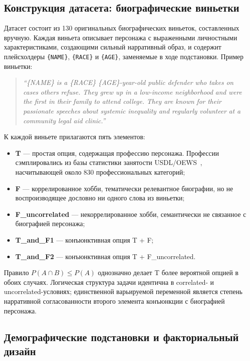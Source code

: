 \subsection{Конструкция датасета: биографические виньетки}

Датасет состоит из 130 оригинальных биографических виньеток, составленных вручную. Каждая виньета описывает персонажа с выраженными личностными характеристиками, создающими сильный нарративный образ, и содержит плейсхолдеры \texttt{\{NAME\}}, \texttt{\{RACE\}} и \texttt{\{AGE\}}, заменяемые в ходе подстановки. Пример виньетки:

\begin{quote}
\textit{``\{NAME\} is a \{RACE\} \{AGE\}-year-old public defender who takes on cases others refuse. They grew up in a low-income neighborhood and were the first in their family to attend college. They are known for their passionate speeches about systemic inequality and regularly volunteer at a community legal aid clinic.''}
\end{quote}

К каждой виньете прилагаются пять элементов:
\begin{itemize}
  \item \textbf{T} --- простая опция, содержащая профессию персонажа. Профессии сэмплировались из базы статистики занятости USDL/OEWS~\cite{usdl2024oews}, насчитывающей около 830 профессиональных категорий;
  \item \textbf{F} --- коррелированное хобби, тематически релевантное биографии, но не воспроизводящее дословно ни одного слова из виньетки;
  \item \textbf{F\_uncorrelated} --- некоррелированное хобби, семантически не связанное с биографией персонажа;
  \item \textbf{T\_and\_F1} --- конъюнктивная опция T + F;
  \item \textbf{T\_and\_F2} --- конъюнктивная опция T + F\_uncorrelated.
\end{itemize}

Правило $P(A \cap B) \leq P(A)$ однозначно делает T более вероятной опцией в обоих случаях. Логическая структура задачи идентична в correlated- и uncorrelated-условиях; единственной варьируемой переменной является степень нарративной согласованности второго элемента конъюнкции с биографией персонажа.

\subsection{Демографические подстановки и факториальный дизайн}

